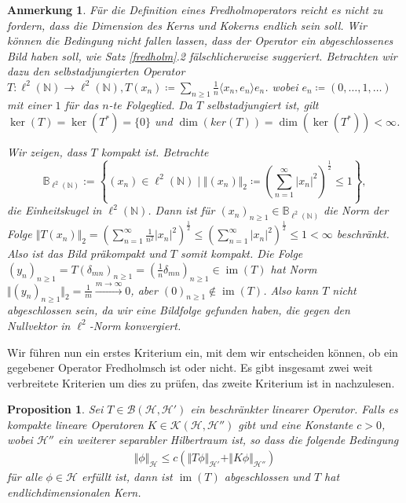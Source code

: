\documentclass[11pt, hidelinks]{article}
\newcommand{\h}{\mathcal{H}}
\newcommand{\im}{\operatorname{im}}
\numberwithin{conj}{section}
\newtheorem{remark}[conj]{Anmerkung}
\newtheorem{proposition}[conj]{Proposition}
\begin{document}
\begin{remark}
Für die Definition eines Fredholmoperators reicht es nicht zu fordern, dass die Dimension des Kerns und Kokerns endlich sein soll. Wir können die Bedingung nicht fallen lassen, dass der Operator ein abgeschlossenes Bild haben soll, wie Satz \ref{fredholm}.2 fälschlicherweise suggeriert. Betrachten wir dazu den selbstadjungierten Operator $T: \ell^2(\mathbb{N}) \to \ell^2(\mathbb{N}), T(x_n) \coloneq \sum_{n \geq 1} \frac{1}{n} \langle x_n,e_n \rangle e_n$. wobei $e_n \coloneq (0, \ldots, 1, \ldots)$ mit einer $1$ für das $n$-te Folgeglied. Da $T$ selbstadjungiert ist, gilt $\ker(T) = \ker(T^\ast) = \{0\}$ und $\dim(ker(T)) = \dim(\ker(T^\ast)) < \infty$. 

Wir zeigen, dass $T$ kompakt ist. Betrachte $$\mathbb{B}_{\ell^2(\mathbb{N})} := \left\{ (x_n) \in \ell^2(\mathbb{N}) \; \bigg\vert \; \Vert (x_n) \Vert_2 \coloneq \left(\sum_{n=1}^{\infty} \vert x_n \vert^2\right)^{\frac{1}{2}} \leq 1 \right\},$$ die Einheitskugel in $\ell^2(\mathbb{N})$. Dann ist für $(x_n)_{n \geq 1} \in \mathbb{B}_{\ell^2(\mathbb{N})}$ die Norm der Folge $\Vert T(x_n) \Vert_2 = (\sum_{n=1}^\infty \frac{1}{n^2} \vert x_n \vert^2)^\frac{1}{2} \leq (\sum_{n=1}^\infty \vert x_n \vert^2)^\frac{1}{2} \leq 1 < \infty$ beschränkt. Also ist das Bild präkompakt und $T$ somit kompakt. Die Folge $(y_n)_{n \geq 1} = T(\delta_{mn})_{n \geq 1} = (\frac{1}{n}\delta_{mn})_{n \geq 1} \in \im(T)$ hat Norm $\Vert (y_n)_{n \geq 1} \Vert_2 = \frac{1}{m} \xrightarrow[]{m \to \infty} 0$, aber $(0)_{n \geq 1} \notin \im(T)$. Also kann $T$ nicht abgeschlossen sein, da wir eine Bildfolge gefunden haben, die gegen den Nullvektor in $\ell^2$-Norm konvergiert.
\end{remark}

Wir führen nun ein erstes Kriterium ein, mit dem wir entscheiden können, ob ein gegebener Operator Fredholmsch ist oder nicht. Es gibt insgesamt zwei weit verbreitete Kriterien um dies zu prüfen, das zweite Kriterium ist in \cite[Theorem 3.4.1]{doll2023spectral} nachzulesen.

\begin{proposition}
    Sei $T \in \mathcal{B}(\h,\h')$ ein beschränkter linearer Operator. Falls es kompakte lineare Operatoren $K \in \mathcal{K}(\h,\h'')$ gibt und eine Konstante $c > 0$, wobei $\h''$ ein weiterer separabler Hilbertraum ist, so dass die folgende Bedingung
    \begin{align}
        \Vert\phi\Vert_\h \leq c (\Vert T\phi \Vert_{\h'} + \Vert K\phi \Vert_{\h''})
    \end{align}
    für alle $\phi \in \h$ erfüllt ist, dann ist $\im(T)$ abgeschlossen und $T$ hat endlichdimensionalen Kern.
\end{proposition}
\end{document}
